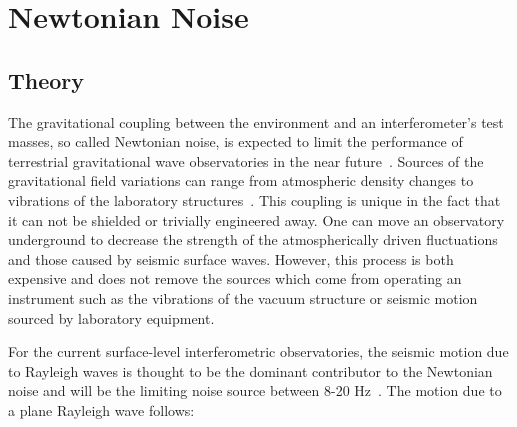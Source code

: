 \documentclass [12pt, proquest]{uwthesis}[2019]
\begin{document}
%

\section{Newtonian Noise}
\subsection{Theory}

The gravitational coupling between the environment and an interferometer's test masses, so called Newtonian noise, is expected to limit the performance of terrestrial gravitational wave observatories in the near future~\cite{Saulson}. Sources of the gravitational field variations can range from atmospheric density changes to vibrations of the laboratory structures~\cite{terrestrial}. This coupling is unique in the fact that it can not be shielded or trivially engineered away. One can move an observatory underground to decrease the strength of the atmospherically driven fluctuations and those caused by seismic surface waves. However, this process is both expensive and does not remove the sources which come from operating an instrument such as the vibrations of the vacuum structure or seismic motion sourced by laboratory equipment. 

For the current surface-level interferometric observatories, the seismic motion due to Rayleigh waves is thought to be the dominant contributor to the Newtonian noise and will be the limiting noise source between 8-20 Hz~\cite{NN2}. The motion due to a plane Rayleigh wave follows:
\end{document}
